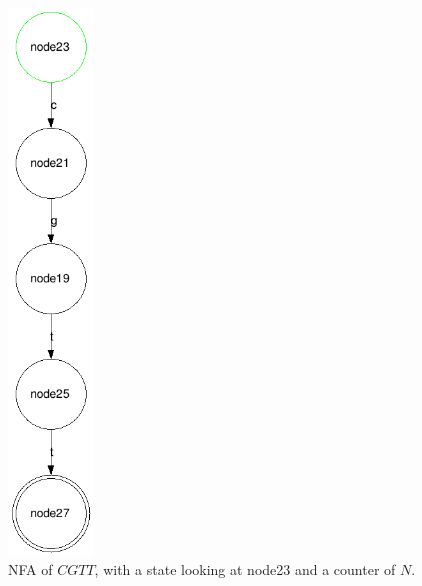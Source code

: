 \begin{figure}[h!]
\begin{minipage}[b]{0.45\linewidth}
  \centering
      \includegraphics[width=0.2\textwidth]{lib/cgtt1.png}
    \caption{NFA of $CGTT$, with a state looking at node23 and a counter of $N$.\\}
    \label{fig:CGTT_1}
  \end{minipage}
\begin{minipage}[b]{0.45\linewidth}
\centering

\end{minipage}
\end{figure}
